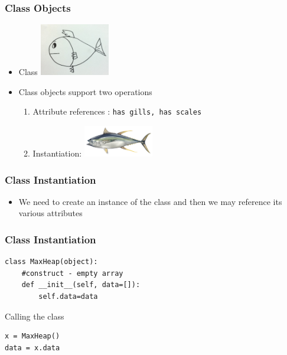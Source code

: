 \documentclass{beamer}
\begin{document}
\begin{frame}
\frametitle{Class Objects}

 
\begin{itemize}
\item Class
\includegraphics[width=1.2in]{fish.jpg}
\item Class objects support two operations
\begin{enumerate}
\item Attribute references : \texttt{has gills, has scales}
\item Instantiation: \includegraphics[width=1.2in]{tuna.jpg}
\end{enumerate}

\end{itemize}




\end{frame}


\begin{frame}
\frametitle{Class Instantiation}

\begin{itemize}


\item We need to create an instance of the class and then we may reference its various attributes

\end{itemize}


\end{frame}



\begin{frame}[fragile]
\frametitle{Class Instantiation}



\begin{Verbatim}
class MaxHeap(object):
	#construct - empty array
	def __init__(self, data=[]):
		self.data=data
\end{Verbatim}

Calling the class

\begin{Verbatim}
x = MaxHeap()
data = x.data
\end{Verbatim}
\end{frame}
\end{document}
